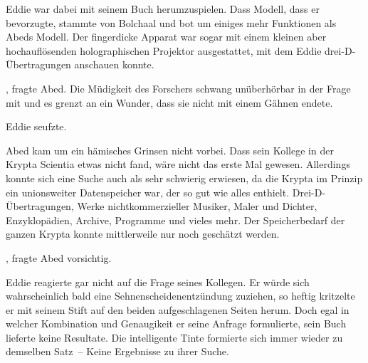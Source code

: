 \par

Eddie war dabei mit seinem Buch herumzuspielen. Dass Modell, dass er bevorzugte, stammte von Bolchaal und bot um einiges mehr Funktionen als Abeds Modell. Der fingerdicke Apparat war sogar mit einem kleinen aber hochauflösenden holographischen Projektor ausgestattet, mit dem Eddie drei-D-Übertragungen anschauen konnte.

\par

, fragte Abed. Die Müdigkeit des Forschers schwang unüberhörbar in der Frage mit und es grenzt an ein Wunder, dass sie nicht mit einem Gähnen endete.

\par

Eddie seufzte. 

\par

Abed kam um ein hämisches Grinsen nicht vorbei. Dass sein Kollege in der Krypta Scientia etwas nicht fand, wäre nicht das erste Mal gewesen. Allerdings konnte sich eine Suche auch als sehr schwierig erwiesen, da die Krypta im Prinzip ein unionsweiter Datenspeicher war, der so gut wie alles enthielt. Drei-D-Übertragungen, Werke nichtkommerzieller Musiker, Maler und Dichter, Enzyklopädien, Archive, Programme und vieles mehr. Der Speicherbedarf der ganzen Krypta konnte mittlerweile nur noch geschätzt werden.

\par

, fragte Abed vorsichtig. 

\par

Eddie reagierte gar nicht auf die Frage seines Kollegen. Er würde sich wahrscheinlich bald eine Sehnenscheidenentzündung zuziehen, so heftig kritzelte er mit seinem Stift auf den beiden aufgeschlagenen Seiten herum. Doch egal in welcher Kombination und Genaugikeit er seine Anfrage formulierte, sein Buch lieferte keine Resultate. Die intelligente Tinte formierte sich immer wieder zu demselben Satz~-- Keine Ergebnisse zu ihrer Suche.

\par

